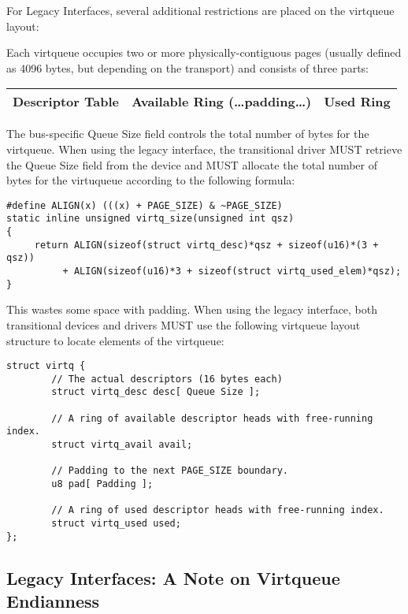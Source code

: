 For Legacy Interfaces, several additional
restrictions are placed on the virtqueue layout:

Each virtqueue occupies two or more physically-contiguous pages
(usually defined as 4096 bytes, but depending on the transport)
and consists of three parts:

\begin{tabular}{|l|l|l|}
\hline
Descriptor Table & Available Ring (\ldots padding\ldots) & Used Ring \\
\hline
\end{tabular}

The bus-specific Queue Size field controls the total number of bytes
for the virtqueue.
When using the legacy interface, the transitional
driver MUST retrieve the Queue Size field from the device
and MUST allocate the total number of bytes for the virtuqueue
according to the following formula:

\begin{lstlisting}
#define ALIGN(x) (((x) + PAGE_SIZE) & ~PAGE_SIZE)
static inline unsigned virtq_size(unsigned int qsz)
{
     return ALIGN(sizeof(struct virtq_desc)*qsz + sizeof(u16)*(3 + qsz))
          + ALIGN(sizeof(u16)*3 + sizeof(struct virtq_used_elem)*qsz);
}
\end{lstlisting}

This wastes some space with padding.
When using the legacy interface, both transitional
devices and drivers MUST use the following virtqueue layout
structure to locate elements of the virtqueue:

\begin{lstlisting}
struct virtq {
        // The actual descriptors (16 bytes each)
        struct virtq_desc desc[ Queue Size ];

        // A ring of available descriptor heads with free-running index.
        struct virtq_avail avail;

        // Padding to the next PAGE_SIZE boundary.
        u8 pad[ Padding ];

        // A ring of used descriptor heads with free-running index.
        struct virtq_used used;
};
\end{lstlisting}

\subsection{Legacy Interfaces: A Note on Virtqueue Endianness}\label{sec:Basic Facilities of a Virtio Device / Virtqueues / Legacy Interfaces: A Note on Virtqueue Endianness}

